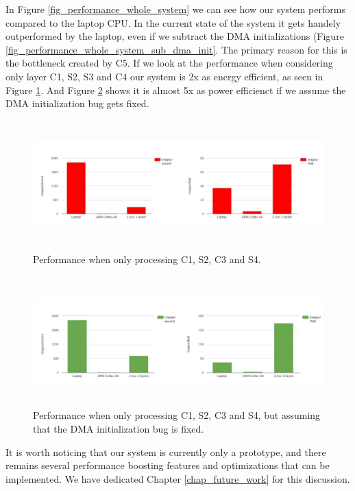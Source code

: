 In Figure \ref{fig_performance_whole_system} we can see how our system performs compared to the laptop CPU. In the current state of the system it gets handely outperformed by the laptop, even if we subtract the DMA initializations (Figure \ref{fig_performance_whole_system_sub_dma_init}. The primary reason for this is the bottleneck created by C5. If we look at the performance when considering only layer C1, S2, S3 and C4 our system is 2x as energy efficient, as seen in Figure \ref{fig_performance_C1C2_laptop}. And Figure \ref{fig_performance_C1C2_laptop_sub_dma_init} shows it is almost 5x as power efficienct if we assume the DMA initialization bug gets fixed. 

\begin{figure}[h!]
	\centering
	\includegraphics[width=1.0\textwidth,height=5cm]{Figures/Results/performance_C1C2_laptop}
	\caption{Performance when only processing C1, S2, C3 and S4.}
	\label{fig_performance_C1C2_laptop}
\end{figure}

\begin{figure}[h!]
	\centering
	\includegraphics[width=1.0\textwidth,height=5cm]{Figures/Results/performance_C1C2_laptop_sub_dma_init}
	\caption{Performance when only processing C1, S2, C3 and S4, but assuming that the DMA initialization bug is fixed.}
	\label{fig_performance_C1C2_laptop_sub_dma_init}
\end{figure}

It is worth noticing that our system is currently only a prototype, and there remains several performance boosting features and optimizations that can be implemented. We have dedicated Chapter \ref{chap_future_work} for this discussion. 
